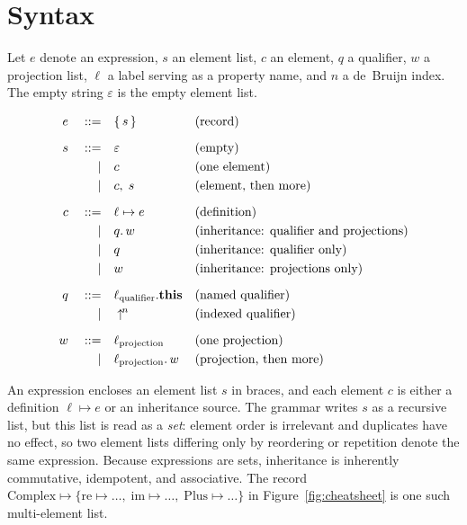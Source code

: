 \section{Syntax}
\label{sec:syntax}

Let $e$ denote an expression, $s$ an element list, $c$ an element,
$q$ a qualifier, $w$ a projection list, $\ell$ a label serving as a
property name, and $n$ a de~Bruijn index.
The empty string $\varepsilon$ is the empty element list.

\begin{align*}
  e \quad ::= \quad & \{\, s \,\}
  && \text{(record)} \\[6pt]
  s \quad ::= \quad & \varepsilon
  && \text{(empty)} \\*
  \mid\quad & c
  && \text{(one element)} \\*
  \mid\quad & c,\; s
  && \text{(element, then more)} \\[6pt]
  c \quad ::= \quad & \ell \mapsto e
  && \text{(definition)} \\*
  \mid\quad & q.\, w
  && \text{(inheritance: qualifier and projections)} \\*
  \mid\quad & q
  && \text{(inheritance: qualifier only)} \\*
  \mid\quad & w
  && \text{(inheritance: projections only)} \\[6pt]
  q \quad ::= \quad & \ell_{\mathrm{qualifier}}.\mathbf{this}
  && \text{(named qualifier)} \\*
  \mid\quad & \uparrow^{\!n}
  && \text{(indexed qualifier)} \\[6pt]
  w \quad ::= \quad & \ell_{\mathrm{projection}}
  && \text{(one projection)} \\*
  \mid\quad & \ell_{\mathrm{projection}}.\, w
  && \text{(projection, then more)}
\end{align*}

An expression encloses an element list $s$ in braces, and each element
$c$ is either a definition $\ell \mapsto e$ or an inheritance source.
The grammar writes $s$ as a recursive list, but this list is read as a
\emph{set}: element order is irrelevant and duplicates have no effect,
so two element lists differing only by reordering or repetition denote
the same expression. Because expressions are sets, inheritance is
inherently commutative, idempotent, and associative.
The record $\mathrm{Complex} \mapsto \{ \mathrm{re} \mapsto \ldots,\;
\mathrm{im} \mapsto \ldots,\; \mathrm{Plus} \mapsto \ldots \}$ in
Figure~\ref{fig:cheatsheet} is one such multi-element list.

